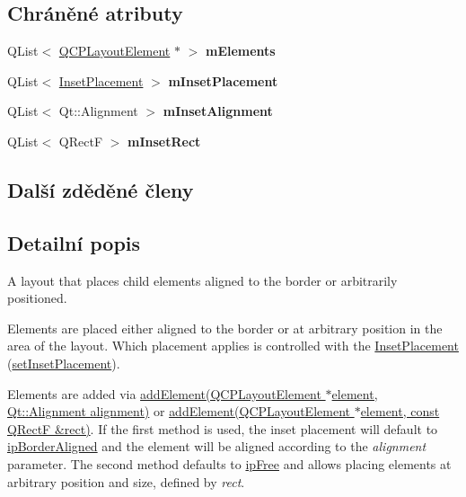\subsection*{Chráněné atributy}
\begin{DoxyCompactItemize}
\item 
\hypertarget{classQCPLayoutInset_a8fff7eae9a1be9a5c1e544fb379f682f}{}Q\+List$<$ \hyperlink{classQCPLayoutElement}{Q\+C\+P\+Layout\+Element} $\ast$ $>$ {\bfseries m\+Elements}\label{classQCPLayoutInset_a8fff7eae9a1be9a5c1e544fb379f682f}

\item 
\hypertarget{classQCPLayoutInset_a57a0a4e445cc78eada29765ecf092abe}{}Q\+List$<$ \hyperlink{classQCPLayoutInset_a8b9e17d9a2768293d2a7d72f5e298192}{Inset\+Placement} $>$ {\bfseries m\+Inset\+Placement}\label{classQCPLayoutInset_a57a0a4e445cc78eada29765ecf092abe}

\item 
\hypertarget{classQCPLayoutInset_a55e9b84c310136ff985a6544184ab64a}{}Q\+List$<$ Qt\+::\+Alignment $>$ {\bfseries m\+Inset\+Alignment}\label{classQCPLayoutInset_a55e9b84c310136ff985a6544184ab64a}

\item 
\hypertarget{classQCPLayoutInset_aaa8f6b5029458f3d97a65239524a2b33}{}Q\+List$<$ Q\+Rect\+F $>$ {\bfseries m\+Inset\+Rect}\label{classQCPLayoutInset_aaa8f6b5029458f3d97a65239524a2b33}

\end{DoxyCompactItemize}
\subsection*{Další zděděné členy}


\subsection{Detailní popis}
A layout that places child elements aligned to the border or arbitrarily positioned. 

Elements are placed either aligned to the border or at arbitrary position in the area of the layout. Which placement applies is controlled with the \hyperlink{classQCPLayoutInset_a8b9e17d9a2768293d2a7d72f5e298192}{Inset\+Placement} (\hyperlink{classQCPLayoutInset_a63298830744d5d8c5345511c00fd2144}{set\+Inset\+Placement}).

Elements are added via \hyperlink{classQCPLayoutInset_ad61529eb576af7f04dff94abb10c745a}{add\+Element(\+Q\+C\+P\+Layout\+Element $\ast$element, Qt\+::\+Alignment alignment)} or \hyperlink{classQCPLayoutInset_a8ff61fbee4a1f0ff45c398009d9f1e56}{add\+Element(\+Q\+C\+P\+Layout\+Element $\ast$element, const Q\+Rect\+F \&rect)}. If the first method is used, the inset placement will default to \hyperlink{classQCPLayoutInset_a8b9e17d9a2768293d2a7d72f5e298192aa81e7df4a785ddee2229a8f47c46e817}{ip\+Border\+Aligned} and the element will be aligned according to the {\itshape alignment} parameter. The second method defaults to \hyperlink{classQCPLayoutInset_a8b9e17d9a2768293d2a7d72f5e298192aa4802986ea2cea457f932b115acba59e}{ip\+Free} and allows placing elements at arbitrary position and size, defined by {\itshape rect}.


